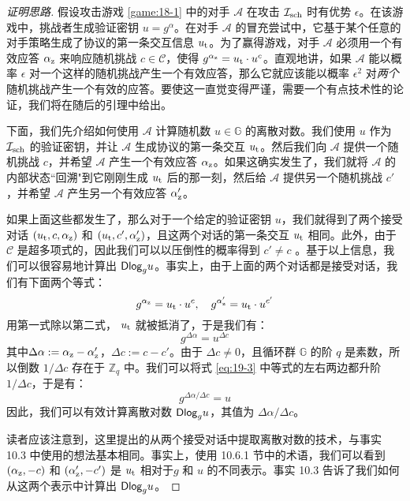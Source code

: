 \begin{proof}[证明思路]
假设攻击游戏 \ref{game:18-1} 中的对手 $\mathcal{A}$ 在攻击 $\mathcal{I}_{\rm sch}$ 时有优势 $\epsilon$。在该游戏中，挑战者生成验证密钥 $u=g^\alpha$。在对手 $\mathcal{A}$ 的冒充尝试中，它基于某个任意的对手策略生成了协议的第一条交互信息 $u_{\rm t}$。为了赢得游戏，对手 $\mathcal{A}$ 必须用一个有效应答 $\alpha_{\rm z}$ 来响应随机挑战 $c\in\mathcal{C}$，使得 $g^{\alpha_{\rm z}}=u_{\rm t}\cdot u^c$。直观地讲，如果 $\mathcal{A}$ 能以概率 $\epsilon$ 对一个这样的随机挑战产生一个有效应答，那么它就应该能以概率 $\epsilon^2$ 对\emph{两个}随机挑战产生一个有效的应答。要使这一直觉变得严谨，需要一个有点技术性的论证，我们将在随后的引理中给出。

下面，我们先介绍如何使用 $\mathcal{A}$ 计算随机数 $u\in\mathbb{G}$ 的离散对数。我们使用 $u$ 作为 $\mathcal{I}_{\rm sch}$ 的验证密钥，并让 $\mathcal{A}$ 生成协议的第一条交互 $u_{\rm t}$。然后我们向 $\mathcal{A}$ 提供一个随机挑战 $c$，并希望 $\mathcal{A}$ 产生一个有效应答 $\alpha_{\rm z}$。如果这确实发生了，我们就将 $\mathcal{A}$ 的内部状态``回溯"到它刚刚生成 $u_{\rm t}$ 后的那一刻，然后给 $\mathcal{A}$ 提供另一个随机挑战 $c'$，并希望 $\mathcal{A}$ 产生另一个有效应答 $\alpha_{\rm z}'$。

如果上面这些都发生了，那么对于一个给定的验证密钥 $u$，我们就得到了两个接受对话 $(u_{\rm t},c,\alpha_{\rm z})$ 和 $(u_{\rm t},c',\alpha_{\rm z}')$，且这两个对话的第一条交互 $u_{\rm t}$ 相同。此外，由于 $\mathcal{C}$ 是超多项式的，因此我们可以以压倒性的概率得到 $c'\neq c$ 。基于以上信息，我们可以很容易地计算出 ${\rm \mathsf{Dlog}}_gu$。事实上，由于上面的两个对话都是接受对话，我们有下面两个等式：
\[
g^{\alpha_{\rm z}}=u_{\rm t}\cdot u^c,
\quad
g^{\alpha_{\rm z}'} =u_{\rm t}\cdot u^{c'}
\]
用第一式除以第二式， $u_{\rm t}$ 就被抵消了，于是我们有：
\begin{equation}\label{eq:19-3}
	g^{\Delta\alpha}=u^{\Delta c}
\end{equation}
其中$\Delta\alpha:=\alpha_{\rm z}-\alpha_{\rm z}'$，$\Delta c:=c-c'$。由于 $\Delta c\neq 0$，且循环群 $\mathbb{G}$ 的阶 $q$ 是素数，所以倒数 ${1}/{\Delta c}$ 存在于 $\mathbb{Z}_q$ 中。我们可以将式 \ref{eq:19-3} 中等式的左右两边都升阶 ${1}/{\Delta c}$，于是有：
\[
g^{{\Delta\alpha}/{\Delta c}}=u
\]
因此，我们可以有效计算离散对数 ${\rm \mathsf{Dlog}}_gu$，其值为 ${\Delta\alpha}/{\Delta c}$。

读者应该注意到，这里提出的从两个接受对话中提取离散对数的技术，与事实 10.3 中使用的想法基本相同。事实上，使用 10.6.1 节中的术语，我们可以看到 $(\alpha_{\rm z},-c)$ 和 $(\alpha_{\rm z}',-c')$ 是 $u_{\rm t}$ 相对于$g$ 和 $u$ 的不同表示。事实 10.3 告诉了我们如何从这两个表示中计算出 ${\rm \mathsf{Dlog}}_gu$。
\end{proof}

